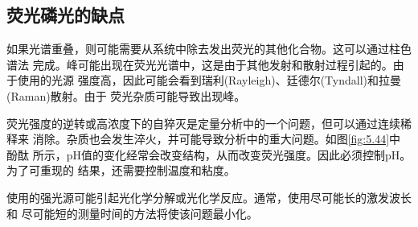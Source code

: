 \subsection{荧光磷光的缺点}
如果光谱重叠，则可能需要从系统中除去发出荧光的其他化合物。这可以通过柱色谱法
完成。峰可能出现在荧光光谱中，这是由于其他发射和散射过程引起的。由于使用的光源
强度高，因此可能会看到瑞利(Rayleigh)、廷德尔(Tyndall)和拉曼(Raman)散射。由于
荧光杂质可能导致出现峰。

荧光强度的逆转或高浓度下的自猝灭是定量分析中的一个问题，但可以通过连续稀释来
消除。杂质也会发生淬火，并可能导致分析中的重大问题。如图\ref{fig:5.44}中酚酞
所示，pH值的变化经常会改变结构，从而改变荧光强度。因此必须控制pH。为了可重现的
结果，还需要控制温度和粘度。

使用的强光源可能引起光化学分解或光化学反应。通常，使用尽可能长的激发波长和
尽可能短的测量时间的方法将使该问题最小化。
